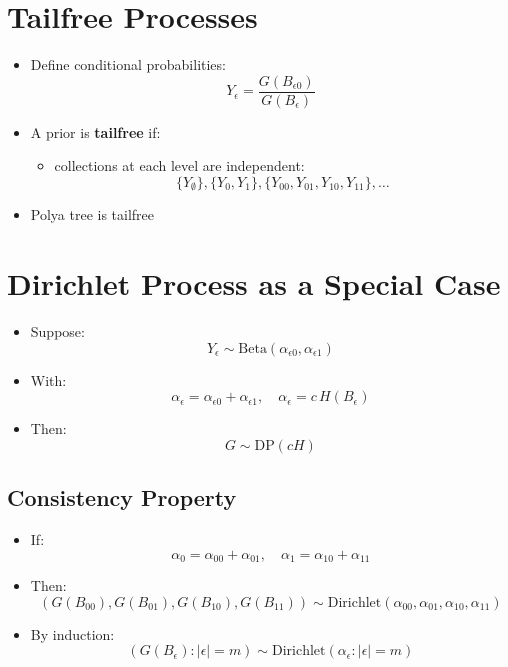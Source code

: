 \documentclass[12pt,oneside]{book}
\numberwithin{equation}{section}
\theoremstyle{definition}
\theoremstyle{plain}
\theoremstyle{remark}
\begin{document}
\section{Tailfree Processes}

\begin{itemize}
\item Define conditional probabilities:
\[
Y_\epsilon = \frac{G(B_{\epsilon 0})}{G(B_\epsilon)}
\]

\item A prior is \textbf{tailfree} if:
\begin{itemize}
\item collections at each level are independent:
\[
\{Y_\emptyset\}, \{Y_0,Y_1\}, \{Y_{00},Y_{01},Y_{10},Y_{11}\}, \dots
\]
\end{itemize}

\item Polya tree is tailfree
\end{itemize}

\section{Dirichlet Process as a Special Case}

\begin{itemize}
\item Suppose:
\[
Y_\epsilon \sim \text{Beta}(\alpha_{\epsilon 0}, \alpha_{\epsilon 1})
\]

\item With:
\[
\alpha_\epsilon = \alpha_{\epsilon 0} + \alpha_{\epsilon 1}, \quad
\alpha_\epsilon = c\,H(B_\epsilon)
\]

\item Then:
\[
G \sim \text{DP}(cH)
\]
\end{itemize}

\subsection{Consistency Property}

\begin{itemize}
\item If:
\[
\alpha_0 = \alpha_{00} + \alpha_{01}, \quad
\alpha_1 = \alpha_{10} + \alpha_{11}
\]

\item Then:
\[
(G(B_{00}), G(B_{01}), G(B_{10}), G(B_{11}))
\sim
\text{Dirichlet}(\alpha_{00}, \alpha_{01}, \alpha_{10}, \alpha_{11})
\]

\item By induction:
\[
(G(B_\epsilon) : |\epsilon| = m)
\sim
\text{Dirichlet}(\alpha_\epsilon : |\epsilon|=m)
\]
\end{itemize}
\end{document}
